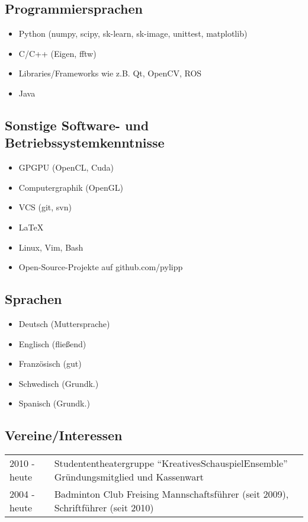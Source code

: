 \documentclass[a4paper,10pt]{memoir}
\begin{document}
\subsection*{Programmiersprachen}
\begin{itemize}
  \item Python (numpy, scipy, sk-learn, sk-image, unittest, matplotlib)
  \item C/C++ (Eigen, fftw)
  \item Libraries/Frameworks wie z.B. Qt, OpenCV, ROS
  \item Java
\end{itemize}

\subsection*{Sonstige Software- und Betriebssystemkenntnisse}
\vspace*{-\baselineskip}
\begin{multicols}{2}
\begin{itemize}
  \item GPGPU (OpenCL, Cuda)
  \item Computergraphik (OpenGL)
  \item VCS (git, svn)
  \item \LaTeX
  \item Linux, Vim, Bash
  \item Open-Source-Projekte auf github.com/pylipp
\end{itemize}
\end{multicols}

\subsection*{Sprachen}
\vspace*{-\baselineskip}
\begin{multicols}{3}
  \begin{itemize}
    \item Deutsch (Muttersprache)
    \item Englisch (fließend)
    \item Französisch (gut)
    \item Schwedisch (Grundk.)
    \item Spanisch (Grundk.)
  \end{itemize}
\end{multicols}

\subsection*{Vereine/Interessen}
\vspace*{-\baselineskip}
\begin{longtable}{@{}p{} p{}}
  2010 - heute &
  Studententheatergruppe ``KreativesSchauspielEnsemble'' \newline
  Gründungsmitglied und Kassenwart
  \\
  2004 - heute &
  Badminton Club Freising \newline
  Mannschaftsführer (seit 2009), Schriftführer (seit 2010)
\end{longtable}
\end{document}
